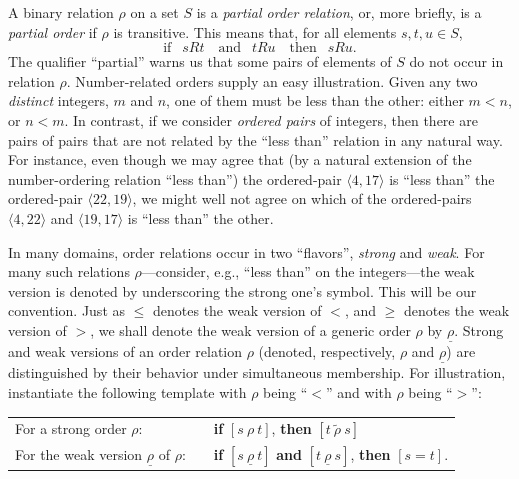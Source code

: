 A binary relation $\rho$ on a set $S$ is a {\it partial order
  relation}, or, more briefly, is a
{\it partial order} if $\rho$ is transitive. This means that, for all elements $s, t, u \in S$,
\begin{equation}
\label{eq:def-transitive}
\mbox{if } \ \ sRt \ \ \ \mbox{ and } \ \ tRu \ \ \ \mbox{ then }
\  \ sRu.
\end{equation}
The qualifier ``partial'' warns us that some pairs of elements of $S$
do not occur in relation $\rho$.  Number-related orders supply an easy
illustration.  Given any two {\em distinct} integers, $m$ and $n$, one
of them must be less than the other: either $m < n$, or $n < m$.  In
contrast, if we consider {\it ordered pairs} of integers, then there
are pairs of pairs that are not related by the ``less than'' relation
in any natural way.  For instance, even though we may agree that (by a
natural extension of the number-ordering relation ``less than'') the
ordered-pair $\langle 4, 17 \rangle$ is ``less than'' the ordered-pair
$\langle 22, 19 \rangle$, we might well not agree on which of the
ordered-pairs $\langle 4, 22 \rangle$ and $\langle 19, 17 \rangle$ is
``less than'' the other.


In many domains, order relations occur in two ``flavors'', {\em
  strong} and {\em weak}. For
many such relations $\rho$---consider, e.g., ``less than'' on the
integers---the weak version is denoted by underscoring the strong
one's symbol.  This will be our convention.  Just as $\leq$ denotes
the weak version of $<$, and $\geq$ denotes the weak version of $>$,
we shall denote the weak version of a generic order $\rho$ by
$\underline{\rho}$.
Strong and weak versions of an order relation $\rho$ (denoted,
respectively, $\rho$ and $\underline{\rho}$) are distinguished by
their behavior under simultaneous membership.  For illustration,
instantiate the following template with $\rho$ being ``$<$'' and with
$\rho$ being ``$>$'':

\smallskip

\begin{tabular}{lll}
For a strong order $\rho$: & &
{\bf if} $[s \ \rho \ t]$, {\bf then} $[t \ \widetilde{\rho} \ s]$ \\
For the weak version $\underline{\rho}$ of $\rho$: & &
{\bf if} $[s \ \underline{\rho} \ t]$ {\bf and} $[t \ \underline{\rho}
  \ s]$, {\bf then} $[s = t]$.
\end{tabular}

